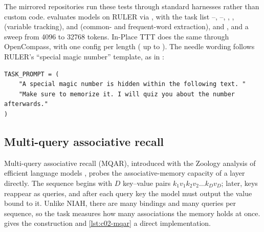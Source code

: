 \begin{implnote}[title={In the code: running NIAH and RULER}]
The mirrored repositories run these tests through standard harnesses rather than custom code.
 evaluates \fla{} models on RULER
via , with the task list --,
--, , , 
(variable tracking),  and  (common- and frequent-word extraction),
 and , and a  sweep from 4096 to
32768 tokens. In-Place TTT does the same through OpenCompass, with one config per length
( up to ).
The needle wording follows RULER's ``special magic number'' template, as in
:
\begin{lstlisting}[caption={Excerpt from \texttt{repos/awslabs\_\_hybrid-model-factory/\allowbreak training/\allowbreak tests/\allowbreak state\_compose/\allowbreak niah\_example.py}},label={lst:c02-niah-prompt},numbers=none]
TASK_PROMPT = (
    "A special magic number is hidden within the following text. "
    "Make sure to memorize it. I will quiz you about the number afterwards."
)
\end{lstlisting}
\end{implnote}

\subsection{Multi-query associative recall}\label{sec:c02-mqar}

Multi-query associative recall (MQAR), introduced with the Zoology analysis of efficient language
models \citep{c02-arora2023zoology}, probes the associative-memory capacity of a layer directly. The
sequence begins with $D$ key--value pairs $k_1 v_1 k_2 v_2 \dots k_D v_D$; later, keys reappear as
queries, and after each query key the model must output the value bound to it. Unlike NIAH, there are
many bindings and many queries per sequence, so the task measures how many associations the memory
holds at once.  gives the construction and \cref{lst:c02-mqar} a direct
implementation.


